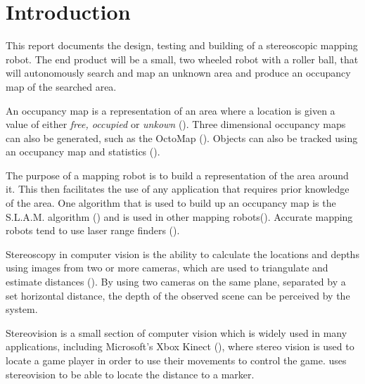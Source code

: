 \chapter{Introduction} \label{Chapter:Introduction}

%
%
%
%


This report documents the design, testing and building of a stereoscopic mapping robot. The end product will be a small, two wheeled robot with a roller ball, that will autonomously search and map an unknown area and produce an occupancy map of the searched area. 

An occupancy map is a representation of an area where a location is given a value of either \textit{free, occupied} or \textit{unkown} (\cite{thrun2003learning}).  Three dimensional occupancy maps can also be generated, such as the OctoMap (\cite{octomap}). Objects can also be tracked using an occupancy map and statistics (\cite{Fleuret:OccupancyMap}). 

The purpose of a mapping robot is to build a representation of the area around it. This then facilitates the use of any application that requires prior knowledge of the area. One algorithm that is used to build up an occupancy map is the S.L.A.M. algorithm (\cite{Thrun:SLAM}) and is used in other mapping robots(\cite{Se:MappingRobot}). Accurate mapping robots tend to use laser range finders (\cite{Ruhnke:LaserMapping}).

Stereoscopy in computer vision is the ability to calculate the locations and depths using images from two or more cameras, which are used to triangulate and estimate distances (\cite{Saxena:DepthEstimation}). By using two cameras on the same plane, separated by a set horizontal distance, the depth of the observed scene can be perceived by the system.

Stereovision is a small section of computer vision which is widely used in many applications, including Microsoft's Xbox Kinect (\cite{Microsoft:Kinect}), where stereo vision is used to locate a game player in order to use their movements to control the game. \cite{Mrovlje:Distance_Stereoscopic} uses stereovision to be able to locate the distance to a marker.

